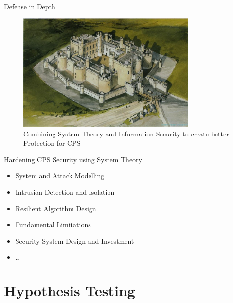 \documentclass[10pt]{beamer}
\begin{document}
\begin{frame}{Defense in Depth}
  \begin{figure}[<+htpb+>]
    \begin{center}
      \includegraphics[width=0.8\textwidth]{defense_in_depth.jpg}
      \caption{Combining System Theory and Information Security to create better Protection for CPS}
    \end{center}
  \end{figure}
\end{frame}

\begin{frame}{Hardening CPS Security using System Theory}
  \begin{itemize}
  \item System and Attack Modelling
  \item Intrusion Detection and Isolation
  \item Resilient Algorithm Design
  \item Fundamental Limitations
  \item Security System Design and Investment
  \item \dots
  \end{itemize}
\end{frame}

\frame{\tableofcontents}

\section{Hypothesis Testing}
\end{document}
